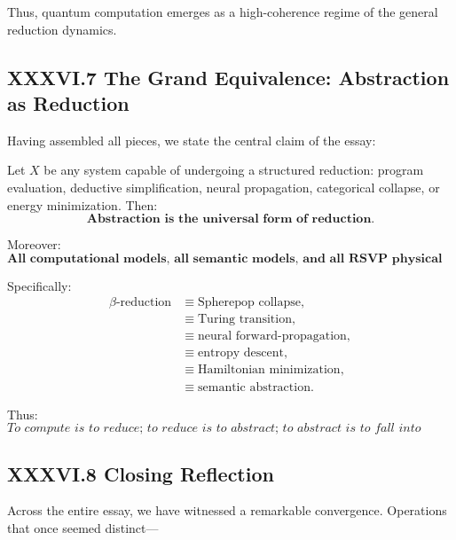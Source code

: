 \documentclass[12pt,letterpaper]{article}
\begin{document}
Thus, quantum computation emerges as a high-coherence regime 
of the general reduction dynamics.

\subsection{XXXVI.7 The Grand Equivalence: Abstraction as Reduction}

Having assembled all pieces, we state the central claim of the essay:

\begin{theorem}
Let $X$ be any system capable of undergoing a structured reduction:
program evaluation, deductive simplification, neural propagation, 
categorical collapse, or energy minimization.
Then:
\[
\boxed{
\textbf{Abstraction is the universal form of reduction.}
}
\]

Moreover:
\[
\textbf{
All computational models,  
all semantic models,  
and all RSVP physical models  
instantiate the same reduction dynamics.}
\]

Specifically:
\[
\begin{aligned}
\beta\text{-reduction}
&\equiv \text{Spherepop collapse},\\
&\equiv \text{Turing transition},\\
&\equiv \text{neural forward-propagation},\\
&\equiv \text{entropy descent},\\
&\equiv \text{Hamiltonian minimization},\\
&\equiv \text{semantic abstraction}.
\end{aligned}
\]

Thus:
\[
\boxed{
\textit{To compute is to reduce;  
to reduce is to abstract;  
to abstract is to fall into alignment with the structure of meaning.}
}
\]
\end{theorem}

\subsection{XXXVI.8 Closing Reflection}

Across the entire essay, we have witnessed a remarkable convergence.  
Operations that once seemed distinct—
\end{document}
